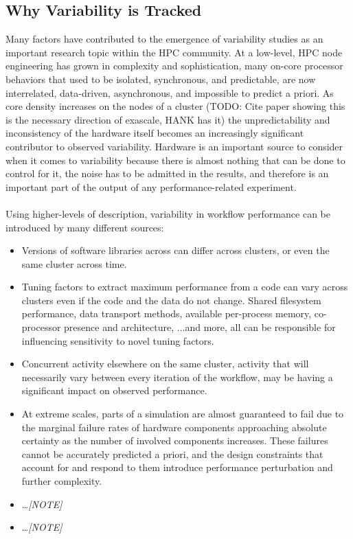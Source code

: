 \documentclass[12pt, conference, compsocconf]{IEEEtran}
\begin{document}
\subsection{Why Variability is Tracked}
Many factors have contributed to the emergence of variability studies as an 
important research topic within the HPC community. At a low-level, HPC node 
engineering has grown in complexity and sophistication, many on-core processor 
behaviors that used to be isolated, synchronous, and predictable, are now 
interrelated, data-driven, asynchronous, and impossible to predict a priori. As 
core density increases on the nodes of a cluster (TODO: Cite paper showing this 
is the necessary direction of exascale, HANK has it) the unpredictability and inconsistency 
of the hardware itself becomes an increasingly significant contributor to 
observed variability. Hardware is an important source to consider when it comes 
to variability because there is almost nothing that can be done to control for 
it, the noise has to be admitted in the results, and therefore is an important 
part of the output of any performance-related experiment.\\
\\
Using higher-levels of  description, variability in workflow 
performance can be introduced by many different sources:
\begin{itemize}
    \item Versions of software libraries across can differ across clusters, or 
    even the same cluster across time.
    \item Tuning factors to extract maximum 
    performance from a code can vary across clusters even if the code and the 
    data do not change. Shared filesystem performance, data transport methods, 
    available per-process memory, 
    co-processor presence and architecture, ...and more, all can be responsible 
    for influencing sensitivity to novel tuning factors.
    \item Concurrent activity elsewhere on the same cluster, activity that will 
    necessarily vary between every iteration of the workflow, may be having a 
    significant impact on observed performance.
    \item At extreme scales, parts of a simulation are almost guaranteed to 
    fail due to the marginal failure rates of hardware components approaching 
    absolute certainty as the number of involved components increases. These 
    failures cannot 
    be accurately predicted a priori, and the design constraints that account 
    for and respond to them introduce performance perturbation and further 
    complexity.
    \item \ldots \textit{[NOTE]}
    \item \ldots \textit{[NOTE]}
\end{itemize}
\end{document}
